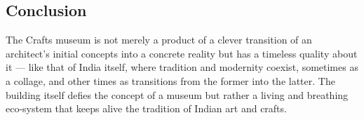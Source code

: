 
\subsection{Conclusion} %
\label{sub:ce_conc}

The Crafts museum is not merely a product of a clever transition of an architect's initial concepts into a concrete reality but has a timeless quality about it --- like that of India itself, where tradition and modernity coexist, sometimes as a collage, and other times as transitions from the former into the latter. The building itself defies the concept of a museum but rather a living and breathing eco-system that keeps alive the tradition of Indian art and crafts.


